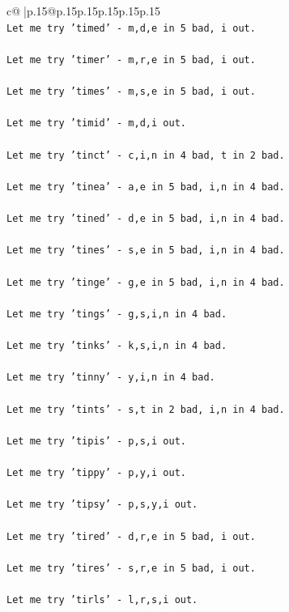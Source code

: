 \documentclass{article}
\begin{document}
{\begin{supertabular}{c@{$\;$}|p{.15\linewidth}@{}p{.15\linewidth}p{.15\linewidth}p{.15\linewidth}p{.15\linewidth}p{.15\linewidth}}
{{{\\ 
\texttt{Let me try 'timed' {-} m,d,e in 5 bad, i out. } \\
\\ 
\texttt{Let me try 'timer' {-} m,r,e in 5 bad, i out. } \\
\\ 
\texttt{Let me try 'times' {-} m,s,e in 5 bad, i out. } \\
\\ 
\texttt{Let me try 'timid' {-} m,d,i out. } \\
\\ 
\texttt{Let me try 'tinct' {-} c,i,n in 4 bad, t in 2 bad. } \\
\\ 
\texttt{Let me try 'tinea' {-} a,e in 5 bad, i,n in 4 bad. } \\
\\ 
\texttt{Let me try 'tined' {-} d,e in 5 bad, i,n in 4 bad. } \\
\\ 
\texttt{Let me try 'tines' {-} s,e in 5 bad, i,n in 4 bad. } \\
\\ 
\texttt{Let me try 'tinge' {-} g,e in 5 bad, i,n in 4 bad. } \\
\\ 
\texttt{Let me try 'tings' {-} g,s,i,n in 4 bad. } \\
\\ 
\texttt{Let me try 'tinks' {-} k,s,i,n in 4 bad. } \\
\\ 
\texttt{Let me try 'tinny' {-} y,i,n in 4 bad. } \\
\\ 
\texttt{Let me try 'tints' {-} s,t in 2 bad, i,n in 4 bad. } \\
\\ 
\texttt{Let me try 'tipis' {-} p,s,i out. } \\
\\ 
\texttt{Let me try 'tippy' {-} p,y,i out. } \\
\\ 
\texttt{Let me try 'tipsy' {-} p,s,y,i out. } \\
\\ 
\texttt{Let me try 'tired' {-} d,r,e in 5 bad, i out. } \\
\\ 
\texttt{Let me try 'tires' {-} s,r,e in 5 bad, i out. } \\
\\ 
\texttt{Let me try 'tirls' {-} l,r,s,i out. } \\
}}}
\end{supertabular}}
\end{document}
